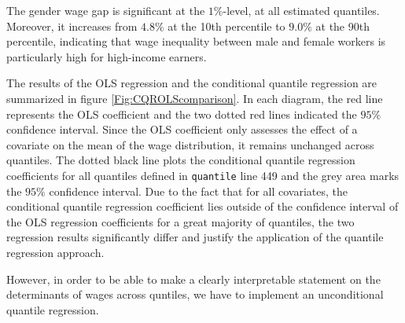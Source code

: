 The gender wage gap is significant at the $1\%$-level, at all estimated quantiles. Moreover, it increases from $4.8\%$ at the 10th percentile to $9.0\%$ at the 90th percentile, indicating that wage inequality between male and female workers is particularly high for high-income earners.

The results of the OLS regression and the conditional quantile regression are summarized in figure \ref{Fig:CQROLScomparison}. In each diagram, the red line represents the OLS coefficient and the two dotted red lines indicated the $95\%$ confidence interval. Since the OLS coefficient only assesses the effect of a covariate on the mean of the wage distribution, it remains unchanged across quantiles. The dotted black line plots the conditional quantile regression coefficients for all quantiles defined in \texttt{quantile} line 449 and the grey area marks the $95\%$ confidence interval. Due to the fact that for all covariates, the conditional quantile regression coefficient lies outside of the confidence interval of the OLS regression coefficients for a great majority of quantiles, the two regression results significantly differ and justify the application of the quantile regression approach.

However, in order to be able to make a clearly interpretable statement on the determinants of wages across quntiles, we have to implement an unconditional quantile regression.

